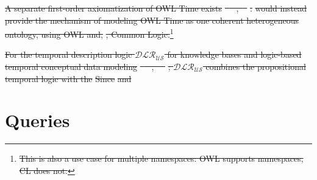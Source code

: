 \documentclass[10pt,fleqn,final]{scrreprt}
\makeatletter
\newcommand*{\eg}{e.g.\@\xspace}
\newcommand*{\DOL}{\ensuremath{\mathsf{DOL}}\xspace}
\newcommand{\sclause}[1]{\section{#1}}
\providecommand{\DIFdel}[1]{{\protect\color{red}\sout{#1}}}                      %
\providecommand{\DIFdelend}{} %
\makeatother
\begin{document}
\DIFdel{A separate first-order axiomatization of OWL Time exists
}%
\DIFdel{\mbox{%
\cite{OWLTime}
}%
,\mbox{%
\cite{OWLSTime}
}%
}%
\DIFdel{.  }%
\DIFdel{would instead provide the mechanism of modeling
OWL Time as one coherent heterogeneous ontology, using OWL and, }%
\DIFdel{, Common Logic.}\footnote{\DIFdel{This is also a use case for multiple namespaces:
  OWL supports namespaces, CL does not.}}  %
\addtocounter{footnote}{-1}%
\DIFdel{For the temporal description
logic $\mathcal{DLR_{US}}$ for knowledge bases and logic-based
temporal conceptual data modeling }%
\DIFdel{\mbox{%
\cite{Artale02}
}%
, \mbox{%
\cite{Artale07a}
}%
}%
\DIFdel{;
$\mathcal{DLR_{US}}$ combines the propositional temporal logic with
the }%
\DIFdel{Since}%
\DIFdel{and }\DIFdelend \sclause{Queries}\label{ex:queries}
\end{document}
